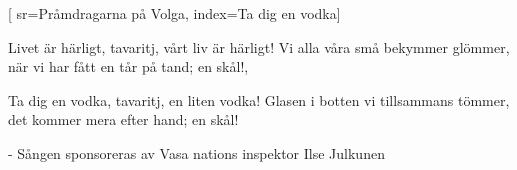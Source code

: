 [ 							
	sr={Pråmdragarna på Volga},
	index={Ta dig en vodka}]		
	
\beginverse*						
Livet är härligt,
tavaritj, vårt liv är härligt!
Vi alla våra små bekymmer glömmer, 
när vi har fått en tår på tand; en skål!,
\endverse						

\beginverse				
Ta dig en vodka, 
tavaritj, en liten vodka! 
Glasen i botten vi tillsammans tömmer,
det kommer mera efter hand; en skål!
\endverse

\beginverse				
- Sången sponsoreras av Vasa nations inspektor Ilse Julkunen
\endverse				
\endsong		
